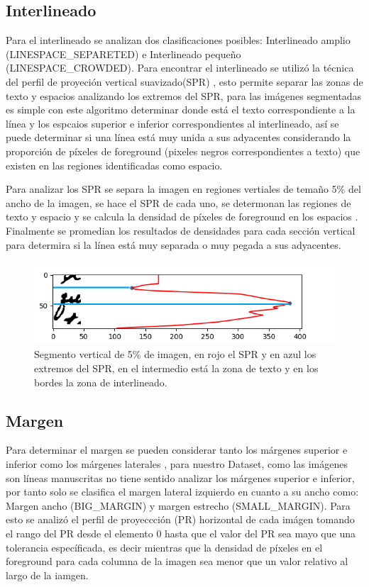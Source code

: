 \documentclass[10pt, a4paper]{article}
\begin{document}
\subsection{Interlineado} 

Para el interlineado se analizan dos clasificaciones posibles: Interlineado amplio (LINESPACE\_SEPARETED) e Interlineado peque\~no (LINESPACE\_CROWDED). Para encontrar el interlineado se utiliz\'o la t\'ecnica del perfil 
de proyeci\'on vertical suavizado(SPR) \cite{20}, esto permite separar las zonas de texto y espacios analizando los extremos del SPR, para las im\'agenes segmentadas es simple con este algoritmo determinar donde est\'a el texto correspondiente a la l\'inea y los espcaios superior e inferior
correspondientes al interlineado, as\'i se puede determinar si una l\'inea est\'a muy unida a sus adyacentes considerando la proporci\'on de p\'ixeles de foreground (pixeles negros correspondientes a texto) que existen en 
las regiones identificadas como espacio.

Para analizar los SPR se separa la imagen en regiones vertiales de tema\~no 5\% del ancho de la imagen, se hace el SPR de cada uno, se determonan las regiones de texto y espacio \cite{22} y se calcula la densidad 
de p\'ixeles de foreground en los espacios . Finalmente se promedian los resultados de densidades para cada secci\'on vertical para determira si la l\'inea est\'a muy separada o muy pegada a sus adyacentes. 

\begin{figure}[!h]
    \centering
    \includegraphics[width = 0.5\linewidth]{Figure_1.png}
    \caption{Segmento vertical de 5\% de imagen, en rojo el SPR y en azul los extremos del SPR, en el intermedio est\'a la zona de texto y en los bordes la zona de interlineado.}
\end{figure}
\subsection{Margen} 

Para determinar el margen se pueden considerar tanto los m\'argenes superior e inferior como los m\'argenes laterales \cite{21}, para nuestro Dataset, como las im\'agenes son l\'ineas manuscritas no tiene sentido analizar los m\'argenes superior e inferior, por tanto solo 
se clasifica el margen lateral izquierdo en cuanto a su ancho como: Margen ancho (BIG\_MARGIN) y margen estrecho (SMALL\_MARGIN). Para esto se analiz\'o el perfil de proyeccci\'on (PR) horizontal de cada im\'agen tomando el rango del PR desde el elemento 0 hasta que el valor del PR 
sea mayo que una tolerancia espec\'ificada, es decir mientras que la densidad de p\'ixeles en el foreground para cada columna de la imagen sea menor que un valor relativo al largo de la iamgen. 
\end{document}

